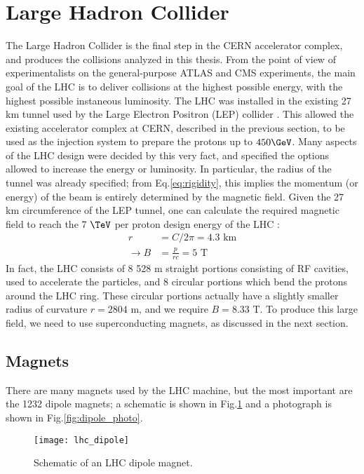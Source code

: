 \section{Large Hadron Collider}

The Large Hadron Collider is the final step in the CERN accelerator complex, and produces the collisions analyzed in this thesis.
From the point of view of experimentalists on the general-purpose ATLAS and CMS experiments, the main goal of the LHC is to deliver collisions at the highest possible energy, with the highest possible instaneous luminosity.
The LHC was installed in the existing 27 km tunnel used by the Large Electron Positron (LEP) collider \cite{lepDesign}.
This allowed the existing accelerator complex at CERN, described in the previous section, to be used as the injection system to prepare the protons up to $450 \GeV$.
Many aspects of the LHC design were decided by this very fact, and specified the options allowed to increase the energy or luminosity.
In particular, the radius of the tunnel was already specified; from Eq.\ref{eq:rigidity}, this implies the momentum (or energy) of the beam is entirely determined by the magnetic field.
Given the 27 km circumference of the LEP tunnel, one can calculate the required magnetic field to reach the 7 $\TeV$ per proton design energy of the LHC :
\begin{align}
r &= C / 2\pi = 4.3 \text{ km} \\
\rightarrow B &= \frac{p}{rc} = 5 \text{ T}
\end{align}
In fact, the LHC consists of 8 528 m straight portions consisting of RF cavities, used to accelerate the particles, and 8 circular portions which bend the protons around the LHC ring.
These circular portions actually have a slightly smaller radius of curvature $r = 2804 $ m, and we require $B = 8.33 \text{ T}$.
To produce this large field, we need to use superconducting magnets, as discussed in the next section.

\subsection{Magnets}

There are many magnets used by the LHC machine, but the most important are the 1232 dipole magnets; a schematic is shown in Fig.\ref{fig:dipole_schematic} and a photograph is shown in Fig.\ref{fig:dipole_photo}.
\begin{figure}
\caption{Schematic of an LHC dipole magnet.}\label{fig:dipole_schematic}
\texttt{[image: lhc\_dipole]}
\end{figure}

